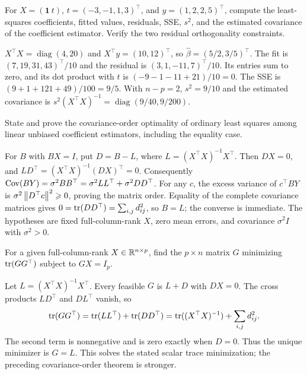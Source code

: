\begin{problem}\label{ex:11:numerical}
For $X=(\mathbf1\ t)$, $t=(-3,-1,1,3)^\top$, and $y=(1,2,2,5)^\top$,
compute the least-squares coefficients, fitted values, residuals, SSE,
$s^2$, and the estimated covariance of the coefficient estimator.
Verify the two residual orthogonality constraints.
\end{problem}
\begin{solution}
$X^\top X=\operatorname{diag}(4,20)$ and $X^\top y=(10,12)^\top$, so
$\widehat\beta=(5/2,3/5)^\top$.
The fit is $(7,19,31,43)^\top/10$ and the residual is
$(3,1,-11,7)^\top/10$. Its entries sum to zero, and its dot product
with $t$ is $(-9-1-11+21)/10=0$.
The SSE is $(9+1+121+49)/100=9/5$. With $n-p=2$,
$s^2=9/10$ and the estimated covariance is
$s^2(X^\top X)^{-1}=\operatorname{diag}(9/40,9/200)$.
\end{solution}

\begin{problem}
State and prove the covariance-order optimality of ordinary least squares
among linear unbiased coefficient estimators, including the equality case.
\end{problem}
\begin{solution}
For $B$ with $BX=I$, put $D=B-L$, where $L=(X^\top X)^{-1}X^\top$.
Then $DX=0$, and $LD^\top=(X^\top X)^{-1}(DX)^\top=0$.
Consequently
$\operatorname{Cov}(BY)=\sigma^2BB^\top=\sigma^2LL^\top+\sigma^2DD^\top$.
For any $c$, the excess variance of $c^\top BY$ is
$\sigma^2\left\lVert D^\top c\right\rVert^2\geqslant0$, proving the matrix order.
Equality of the complete covariance matrices gives
$0=\operatorname{tr}(DD^\top)=\sum_{i,j}d_{ij}^2$, so $B=L$; the converse is immediate.
The hypotheses are fixed full-column-rank $X$, zero mean errors, and
covariance $\sigma^2I$ with $\sigma^2>0$.
\end{solution}

\begin{problem}
For a given full-column-rank $X\in\mathbb R^{n\times p}$, find the
$p\times n$ matrix $G$ minimizing $\operatorname{tr}(GG^\top)$ subject to $GX=I_p$.
\end{problem}
\begin{solution}
Let $L=(X^\top X)^{-1}X^\top$. Every feasible $G$ is $L+D$ with $DX=0$.
The cross products $LD^\top$ and $DL^\top$ vanish, so
\[
\operatorname{tr}(GG^\top)=\operatorname{tr}(LL^\top)+\operatorname{tr}(DD^\top)
=\operatorname{tr}((X^\top X)^{-1})+\sum_{i,j}d_{ij}^2.
\]
The second term is nonnegative and is zero exactly when $D=0$.
Thus the unique minimizer is $G=L$. This solves the stated scalar trace
minimization; the preceding covariance-order theorem is stronger.
\end{solution}

